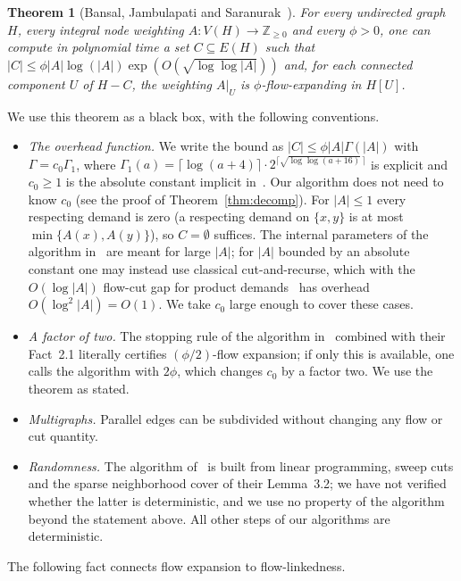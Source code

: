 \documentclass[11pt,letterpaper]{article}
\newtheorem{theorem}{Theorem}[section]
\theoremstyle{definition}
\newcommand{\Z}{\mathbb{Z}}
\begin{document}
\begin{theorem}[{Bansal, Jambulapati and Saranurak~\cite[Theorem~3.1]{BJS26}}]\label{thm:bjs}
For every undirected graph $H$, every integral node weighting $A:V(H)\to\Z_{\ge0}$ and every
$\phi>0$, one can compute in polynomial time a set $C\subseteq E(H)$ such that
$|C|\le\phi|A|\log(|A|)\exp(O(\sqrt{\log\log|A|}))$ and, for each connected component $U$ of
$H-C$, the weighting $A|_U$ is $\phi$-flow-expanding in $H[U]$.
\end{theorem}

We use this theorem as a black box, with the following conventions.
\begin{itemize}[nosep]
\item \emph{The overhead function.} We write the bound as $|C|\le\phi|A|\Gamma(|A|)$ with
$\Gamma=c_0\Gamma_1$, where $\Gamma_1(a)=\lceil\log(a+4)\rceil\cdot2^{\lceil\sqrt{\log\log(a+16)}\,\rceil}$
is explicit and $c_0\ge1$ is the absolute constant implicit in~\cite{BJS26}. Our algorithm
does not need to know $c_0$ (see the proof of Theorem~\ref{thm:decomp}). For $|A|\le1$ every
respecting demand is zero (a respecting demand on $\{x,y\}$ is at most $\min\{A(x),A(y)\}$), so
$C=\emptyset$ suffices. The internal parameters of the algorithm in~\cite{BJS26} are meant for
large $|A|$; for $|A|$ bounded by an absolute constant one may instead use classical
cut-and-recurse, which with the $O(\log|A|)$ flow-cut gap for product
demands~\cite{LR99,LLR95,AR98} has overhead $O(\log^2|A|)=O(1)$. We take $c_0$ large enough to
cover these cases.
\item \emph{A factor of two.} The stopping rule of the algorithm in~\cite{BJS26} combined with
their Fact~2.1 literally certifies $(\phi/2)$-flow expansion; if only this is available, one
calls the algorithm with $2\phi$, which changes $c_0$ by a factor two. We use the theorem as
stated.
\item \emph{Multigraphs.} Parallel edges can be subdivided without changing any flow or cut
quantity.
\item \emph{Randomness.} The algorithm of~\cite{BJS26} is built from linear programming, sweep
cuts and the sparse neighborhood cover of their Lemma~3.2; we have not verified whether the
latter is deterministic, and we use no property of the algorithm beyond the statement above.
All other steps of our algorithms are deterministic.
\end{itemize}

The following fact connects flow expansion to flow-linkedness.
\end{document}
